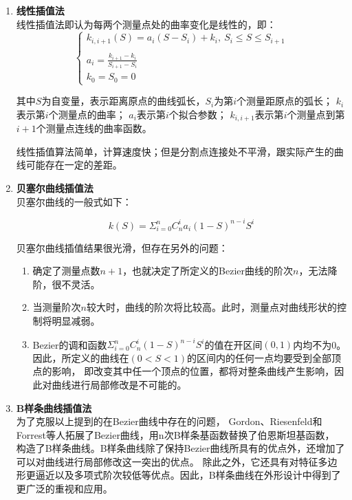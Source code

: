 \begin{enumerate}[label=(\Alph*)]
    \item \textbf{线性插值法} \\
    线性插值法即认为每两个测量点处的曲率变化是线性的，即：
    \begin{equation}
    \left\{
        \begin{array}{lr}
        k_{i, i+1} (S) = a_i (S - S_i) + k_i, \ S_i\leq S\leq S_{i+1}\\
    \\
        a_i = \frac{k_{i+1} - k_i}{S_{i+1} - S_i}
    \\
        k_0 = S_0 = 0
        \end{array}
    \right.
    \end{equation}

    其中$S$为自变量，表示距离原点的曲线弧长，$S_i$为第$i$个测量距原点的弧长；
    $k_i$表示第$i$个测量点的曲率；
    $a_i$表示第$i$个拟合参数；
    $k_{i, i+1}$表示第$i$个测量点到第$i+1$个测量点连线的曲率函数。
    
    线性插值算法简单，计算速度快；但是分割点连接处不平滑，跟实际产生的曲线可能存在一定的差距。

    \item \textbf{贝塞尔曲线插值法} \\
    贝塞尔曲线的一般式如下：

    \begin{equation}
        k(S) = \Sigma_{i=0}^nC_n ^ i a_i(1-S)^{n - i}S^i
    \end{equation}

    贝塞尔曲线插值结果很光滑，但存在另外的问题：

    \begin{enumerate}[label=(\alph*)]
        \item 确定了测量点数$n+1$，也就决定了所定义的Bezier曲线的阶次$n$，无法降阶，很不灵活。
        \item 当测量阶次$n$较大时，曲线的阶次将比较高。此时，测量点对曲线形状的控制将明显减弱。
        \item Bezier的调和函数$\Sigma_{i=0}^nC_n ^ i (1-S)^{n - i}S^i$的值在开区间$(0,1)$内均不为0。
        因此，所定义的曲线在$(0<S<1)$的区间内的任何一点均要受到全部顶点的影响，
        即改变其中任一个顶点的位置，都将对整条曲线产生影响，因此对曲线进行局部修改是不可能的。
    \end{enumerate}

    \item \textbf{B样条曲线插值法} \\
    为了克服以上提到的在Bezier曲线中存在的问题，
    Gordon、Riesenfeld和Forrest等人拓展了Bezier曲线，用n次B样条基函数替换了伯恩斯坦基函数，
    构造了B样条曲线。B样条曲线除了保持Bezier曲线所具有的优点外，还增加了可以对曲线进行局部修改这一突出的优点。
    除此之外，它还具有对特征多边形更逼近以及多项式阶次较低等优点。因此，B样条曲线在外形设计中得到了更广泛的重视和应用。


\end{enumerate}
